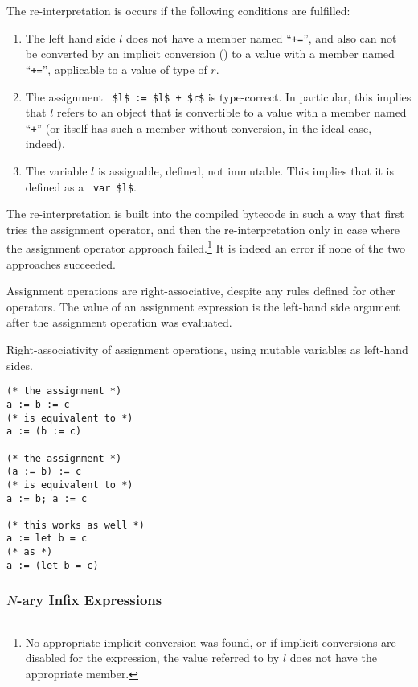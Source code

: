 The re-interpretation is occurs if the following conditions are fulfilled:
\begin{enumerate}
  \item The left hand side $l$ does not have a member named ``\lstinline!+=!'', and also can not be converted by an implicit conversion () to a value with a member named ``\lstinline!+=!'', applicable to a value of type of $r$. 
  \item The assignment ~\lstinline!$l$ := $l$ + $r$! is type-correct. In particular, this implies that $l$ refers to an object that is convertible to a value with a member named ``\lstinline!+!'' (or itself has such a member without conversion, in the ideal case, indeed). 
  \item The variable $l$ is assignable, defined, not immutable. This implies that it is defined as a ~\lstinline!var $l$!. 
\end{enumerate}

The re-interpretation is built into the compiled bytecode in such a way that first tries the assignment operator, and then the re-interpretation only in case where the assignment operator approach failed.\footnote{No appropriate implicit conversion was found, or if implicit conversions are disabled for the expression, the value referred to by $l$ does not have the appropriate member.} It is indeed an error if none of the two approaches succeeded. 

Assignment operations are right-associative, despite any rules defined for other operators. The value of an assignment expression is the left-hand side argument after the assignment operation was evaluated. 

\example Right-associativity of assignment operations, using mutable variables as left-hand sides. 
\begin{lstlisting}
(* the assignment *)
a := b := c
(* is equivalent to *)
a := (b := c)

(* the assignment *)
(a := b) := c
(* is equivalent to *)
a := b; a := c

(* this works as well *)
a := let b = c
(* as *)
a := (let b = c)
\end{lstlisting}




\subsubsection{$N$-ary Infix Expressions}
\label{sec:nary-infix-expressions}

